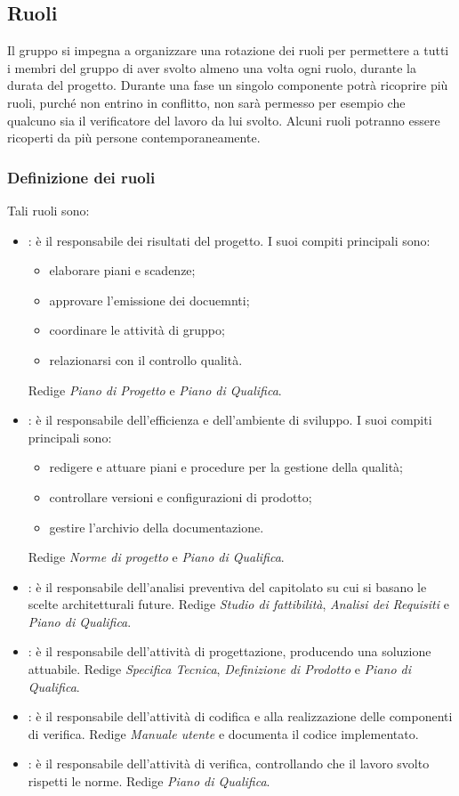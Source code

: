 \subsection{Ruoli}
Il gruppo \GroupName si impegna a organizzare una rotazione dei ruoli per permettere a tutti i membri del gruppo di aver svolto almeno una volta ogni ruolo, durante la durata del progetto. Durante una fase un singolo componente potrà ricoprire più ruoli, purché non entrino in conflitto, non sarà permesso per esempio che qualcuno sia il verificatore del lavoro da lui svolto. Alcuni ruoli potranno essere ricoperti da più persone contemporaneamente.
\subsubsection{Definizione dei ruoli}
Tali ruoli sono:
\begin{itemize}
	\item \Responsabile: è il responsabile dei risultati del progetto. I suoi compiti principali sono:
	\begin{itemize}
		\item elaborare piani e scadenze;
		\item approvare l'emissione dei docuemnti;
		\item coordinare le attività di gruppo;
		\item relazionarsi con il controllo qualità.
	\end{itemize}
	Redige \textit{Piano di Progetto} e \textit{Piano di Qualifica}.
	\item \Amministratore: è il responsabile dell'efficienza e dell'ambiente di sviluppo. I suoi compiti principali sono:
	\begin{itemize}
		\item redigere e attuare piani e procedure per la gestione della qualità;
		\item controllare versioni e configurazioni di prodotto;
		\item gestire l'archivio della documentazione.
	\end{itemize}
	Redige \textit{Norme di progetto} e \textit{Piano di Qualifica}.
	\item \Analista: è il responsabile dell'analisi preventiva del capitolato su cui si basano le scelte architetturali future.
	Redige \textit{Studio di fattibilità}, \textit{Analisi dei Requisiti} e \textit{Piano di Qualifica}.
	\item \Progettista: è il responsabile dell'attività di progettazione, producendo una soluzione attuabile.
	Redige \textit{Specifica Tecnica}, \textit{Definizione di Prodotto} e \textit{Piano di Qualifica}.
	\item \Programmatore: è il responsabile dell'attività di codifica e alla realizzazione delle componenti di verifica.
	Redige \textit{Manuale utente} e documenta il codice implementato.
	\item \Verificatore: è il responsabile dell'attività di verifica, controllando che il lavoro svolto rispetti le norme.
	Redige \textit{Piano di Qualifica}.
\end{itemize}
